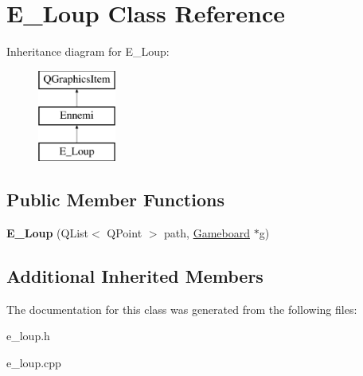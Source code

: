 \hypertarget{class_e___loup}{}\section{E\+\_\+\+Loup Class Reference}
\label{class_e___loup}
Inheritance diagram for E\+\_\+\+Loup\+:\begin{figure}[H]
\begin{center}
\leavevmode
\includegraphics[height=3.000000cm]{class_e___loup}
\end{center}
\end{figure}
\subsection*{Public Member Functions}
\begin{DoxyCompactItemize}
\item 
\hypertarget{class_e___loup_a93c72a161ae4093e7bb9ab7d495ca555}{}{\bfseries E\+\_\+\+Loup} (Q\+List$<$ Q\+Point $>$ path, \hyperlink{class_gameboard}{Gameboard} $\ast$g)\label{class_e___loup_a93c72a161ae4093e7bb9ab7d495ca555}

\end{DoxyCompactItemize}
\subsection*{Additional Inherited Members}


The documentation for this class was generated from the following files\+:\begin{DoxyCompactItemize}
\item 
e\+\_\+loup.\+h\item 
e\+\_\+loup.\+cpp\end{DoxyCompactItemize}
